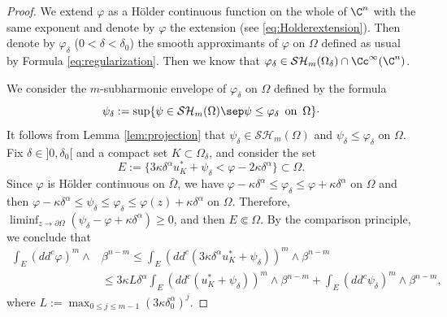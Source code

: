 \begin{proof}
We extend $\varphi$ as a Hölder continuous function on the whole of $\C^n$ with the same exponent and denote by $\varphi$ the extension (see \eqref{eq:Holderextension}).
Then denote by $\varphi_{\delta}$ ($0 < \delta < \delta_0$) the smooth approximants of $\varphi $ on $\Omega$ defined as usual by Formula \eqref{eq:regularization}. Then we know that $\varphi_\delta \in \mathcal{SH}_m (\Omega_{\delta})\cap\Cc^{\infty}(\C^n)$.

We consider the $m$-subharmonic envelope of $\varphi_\delta$ on $\Omega$ defined by the formula
\[
\psi_\delta:= \sup \{\psi \in \mathcal{SH}_m (\Omega) \sep \psi \leq \varphi_\delta \, \, \, \hbox{on} \, \, \, \Omega \}\cdot
\]
It follows from Lemma \ref{lem:projection} that $\psi_\delta \in \mathcal{SH}_m (\Omega)$ and $\psi_\delta \leq \varphi_\delta $ on $\Omega$. Fix $\delta \in{}]0, \delta _0[$ and a compact set $K \subset \Omega_\delta$, and consider the set
\[
E:=\{3 \kappa \delta^\alpha u_K^*+ \psi_\delta<\varphi- 2 \kappa \delta^{\alpha}\} \subset \Omega.
\]
Since $\varphi $ is Hölder continuous on $\bar \Omega$, we have $\varphi - \kappa \delta^\alpha\leq \varphi_{\delta} \leq \varphi + \kappa \delta^{\alpha}$ on $\Omega$ and then $\varphi - \kappa \delta^\alpha \leq \psi_\delta \leq \varphi_{\delta} \leq \varphi (z) + \kappa \delta^\alpha$ on $\Omega$.
Therefore, $\liminf_{z \to \partial \Omega} (\psi_\delta - \varphi + \kappa \delta^\alpha ) \geq 0$, and then $E \Subset \Omega$. By the comparison principle, we conclude that
\begin{equation}\label{eq:fundmentalestimate}
\begin{split}
\int_{E}(dd^c\varphi)^m\wedge&\beta^{n-m} \leq \int_{E}(dd^c(3 \kappa \delta^\alpha u_K^* + \psi_{\delta}))^m\wedge\beta^{n-m} \\
& \leq 3 \kappa L \delta^\alpha \int_{E}(dd^c(u_K^* + \psi_{\delta}))^m\wedge\beta^{n-m}+\int_{E}(dd^c\psi_{\delta})^m\wedge\beta^{n-m},
\end{split}
\end{equation}
where $L:= \max_{0 \leq j \leq m - 1} (3 \kappa \delta_0^\alpha)^j$.


\end{proof}

